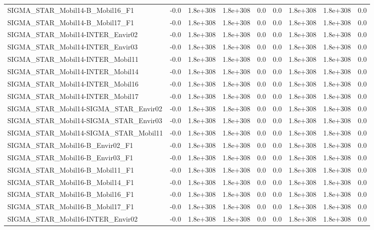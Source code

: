\begin{tabular}{lrrrrrrrr}
SIGMA_STAR_Mobil14-B_Mobil16_F1 & -0.0 & 1.8e+308 & 1.8e+308 & 0.0 & 0.0 & 1.8e+308 & 1.8e+308 & 0.0 \\
SIGMA_STAR_Mobil14-B_Mobil17_F1 & -0.0 & 1.8e+308 & 1.8e+308 & 0.0 & 0.0 & 1.8e+308 & 1.8e+308 & 0.0 \\
SIGMA_STAR_Mobil14-INTER_Envir02 & -0.0 & 1.8e+308 & 1.8e+308 & 0.0 & 0.0 & 1.8e+308 & 1.8e+308 & 0.0 \\
SIGMA_STAR_Mobil14-INTER_Envir03 & -0.0 & 1.8e+308 & 1.8e+308 & 0.0 & 0.0 & 1.8e+308 & 1.8e+308 & 0.0 \\
SIGMA_STAR_Mobil14-INTER_Mobil11 & -0.0 & 1.8e+308 & 1.8e+308 & 0.0 & 0.0 & 1.8e+308 & 1.8e+308 & 0.0 \\
SIGMA_STAR_Mobil14-INTER_Mobil14 & -0.0 & 1.8e+308 & 1.8e+308 & 0.0 & 0.0 & 1.8e+308 & 1.8e+308 & 0.0 \\
SIGMA_STAR_Mobil14-INTER_Mobil16 & -0.0 & 1.8e+308 & 1.8e+308 & 0.0 & 0.0 & 1.8e+308 & 1.8e+308 & 0.0 \\
SIGMA_STAR_Mobil14-INTER_Mobil17 & -0.0 & 1.8e+308 & 1.8e+308 & 0.0 & 0.0 & 1.8e+308 & 1.8e+308 & 0.0 \\
SIGMA_STAR_Mobil14-SIGMA_STAR_Envir02 & -0.0 & 1.8e+308 & 1.8e+308 & 0.0 & 0.0 & 1.8e+308 & 1.8e+308 & 0.0 \\
SIGMA_STAR_Mobil14-SIGMA_STAR_Envir03 & -0.0 & 1.8e+308 & 1.8e+308 & 0.0 & 0.0 & 1.8e+308 & 1.8e+308 & 0.0 \\
SIGMA_STAR_Mobil14-SIGMA_STAR_Mobil11 & -0.0 & 1.8e+308 & 1.8e+308 & 0.0 & 0.0 & 1.8e+308 & 1.8e+308 & 0.0 \\
SIGMA_STAR_Mobil16-B_Envir02_F1 & -0.0 & 1.8e+308 & 1.8e+308 & 0.0 & 0.0 & 1.8e+308 & 1.8e+308 & 0.0 \\
SIGMA_STAR_Mobil16-B_Envir03_F1 & -0.0 & 1.8e+308 & 1.8e+308 & 0.0 & 0.0 & 1.8e+308 & 1.8e+308 & 0.0 \\
SIGMA_STAR_Mobil16-B_Mobil11_F1 & -0.0 & 1.8e+308 & 1.8e+308 & 0.0 & 0.0 & 1.8e+308 & 1.8e+308 & 0.0 \\
SIGMA_STAR_Mobil16-B_Mobil14_F1 & -0.0 & 1.8e+308 & 1.8e+308 & 0.0 & 0.0 & 1.8e+308 & 1.8e+308 & 0.0 \\
SIGMA_STAR_Mobil16-B_Mobil16_F1 & -0.0 & 1.8e+308 & 1.8e+308 & 0.0 & 0.0 & 1.8e+308 & 1.8e+308 & 0.0 \\
SIGMA_STAR_Mobil16-B_Mobil17_F1 & -0.0 & 1.8e+308 & 1.8e+308 & 0.0 & 0.0 & 1.8e+308 & 1.8e+308 & 0.0 \\
SIGMA_STAR_Mobil16-INTER_Envir02 & -0.0 & 1.8e+308 & 1.8e+308 & 0.0 & 0.0 & 1.8e+308 & 1.8e+308 & 0.0 \\

\end{tabular}
